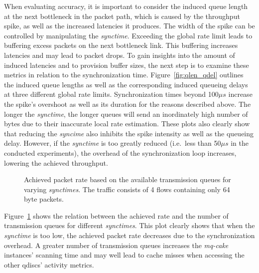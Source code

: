 %
When evaluating accuracy, it is important to consider the induced queue length at the next bottleneck in the packet path, which is caused by the throughput spike, as well as the increased latencies it produces.
%
The width of the spike can be controlled by manipulating the \textit{synctime}.
%
Exceeding the global rate limit leads to buffering excess packets on the next bottleneck link.
%
This buffering increases latencies and may lead to packet drops.
%
To gain insights into the amount of induced latencies and to provision buffer sizes, the next step is to examine these metrics in relation to the synchronization time. 
%
Figure~\ref{fig:qlen_qdel} outlines the induced queue lengths as well as the corresponding induced queueing delays at three different global rate limits.
%
Synchronization times beyond 100$\mu s$ increase the spike's overshoot as well as its duration for the reasons described above.
%
The longer the \textit{synctime}, the longer queues will send an inordinately high number of bytes due to their inaccurate local rate estimation.
%
These plots also clearly show that reducing the \textit{syncime} also inhibits the spike intensity as well as the queueing delay.
%
However, if the \textit{synctime} is too greatly reduced (i.e.\ less than 50$\mu s$ in the conducted experiments), the overhead of the synchronization loop increases, lowering the achieved throughput.
%
\begin{figure}[H]
    \centering
    
    \caption{Achieved packet rate based on the available transmission queues for varying \textit{synctimes}. The traffic consists of 4 flows containing only 64 byte packets.}\label{fig:sync_txq_64}
\end{figure}
Figure~\ref{fig:sync_txq_64} shows the relation between the achieved rate and the number of transmission queues for different \textit{synctimes}.
%
This plot clearly shows that when the \textit{synctime} is too low, the achieved packet rate decreases due to the synchronization overhead.
%
A greater number of transmission queues increases the \textit{mq-cake} instances' scanning time and may well lead to cache misses when accessing the other qdiscs' activity metrics.
%

